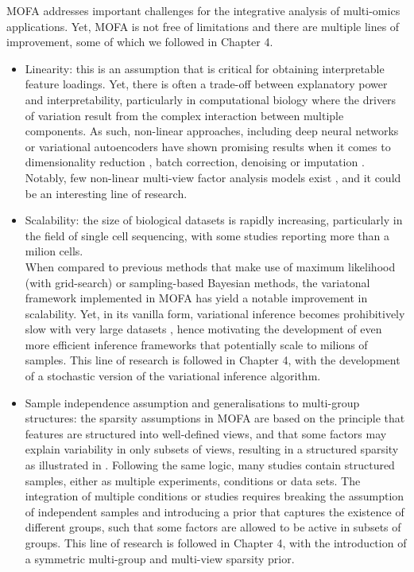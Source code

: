MOFA addresses important challenges for the integrative analysis of multi-omics applications. Yet, MOFA is not free of limitations and there are multiple lines of improvement, some of which we followed in Chapter 4.\\
\begin{itemize}

	\item Linearity: this is an assumption that is critical for obtaining interpretable feature loadings. Yet, there is often a trade-off between explanatory power and interpretability, particularly in computational biology where the drivers of variation result from the complex interaction between multiple components. As such, non-linear approaches, including deep neural networks or variational autoencoders have shown promising results when it comes to dimensionality reduction \cite{Lin2017,Ding2018,Lopez2018}, batch correction\cite{Lopez2018}, denoising \cite{Eraslan2019} or imputation \cite{Lin2016}. Notably, few non-linear multi-view factor analysis models exist \cite{Damianou2016}, and it could be an interesting line of research.

	\item Scalability: the size of biological datasets is rapidly increasing, particularly in the field of single cell sequencing, with some studies reporting more than a milion cells\cite{Svensson2018,Cao2019}. \\
	When compared to previous methods that make use of maximum likelihood (with grid-search) or sampling-based Bayesian methods,  the variatonal framework implemented in MOFA has yield a notable improvement in scalability. Yet, in its vanilla form, variational inference becomes prohibitively slow with very large datasets \cite{Hoffman2013,Blei2016,Hoffman2014}, hence motivating the development of even more efficient inference frameworks that potentially scale to milions of samples. This line of research is followed in Chapter 4, with the development of a stochastic version of the variational inference algorithm.

	\item Sample independence assumption and generalisations to multi-group structures: the sparsity assumptions in MOFA are based on the principle that features are structured into well-defined views, and that some factors may explain variability in only subsets of views, resulting in a structured sparsity as illustrated in . Following the same logic, many studies contain structured samples, either as multiple experiments, conditions or data sets. The integration of multiple conditions or studies requires breaking the assumption of independent samples and introducing a prior that captures the existence of different groups, such that some factors are allowed to be active in subsets of groups. This line of research is followed in Chapter 4, with the introduction of a symmetric multi-group and multi-view sparsity prior.


\end{itemize}
